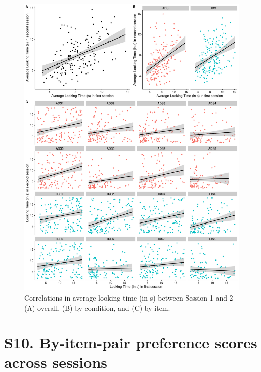 \documentclass[
  man, donotrepeattitle,floatsintext]{apa6}
\begin{document}
\begin{figure}

{\centering \includegraphics{MB1T_supplement_files/figure-latex/sfig8-1} 

}

\caption{Correlations in average looking time (in s) between Session 1 and 2 (A) overall, (B) by condition, and (C) by item.}\label{fig:sfig8}
\end{figure}

\newpage

\hypertarget{s10.-by-item-pair-preference-scores-across-sessions}{%
\section{S10. By-item-pair preference scores across sessions}\label{s10.-by-item-pair-preference-scores-across-sessions}}
\end{document}
